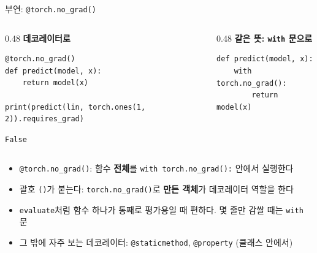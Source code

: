 \documentclass[aspectratio=169,11pt]{beamer}
\newcommand{\code}[1]{\texttt{#1}}
\begin{document}
\begin{frame}[fragile]{부연: \code{@torch.no\_grad()}}
\begin{columns}[T,onlytextwidth]
\begin{column}{0.48\textwidth}
\textbf{데코레이터로}
\begin{lstlisting}
@torch.no_grad()
def predict(model, x):
    return model(x)

print(predict(lin, torch.ones(1, 2)).requires_grad)
\end{lstlisting}
\begin{lstlisting}[style=outstyle]
False
\end{lstlisting}
\end{column}
\begin{column}{0.48\textwidth}
\textbf{같은 뜻: \code{with} 문으로}
\begin{lstlisting}
def predict(model, x):
    with torch.no_grad():
        return model(x)
\end{lstlisting}
\end{column}
\end{columns}
\vskip2mm
\begin{itemize}
\item \code{@torch.no\_grad()}: 함수 \textbf{전체}를 \code{with torch.no\_grad():} 안에서 실행한다
\item 괄호 \code{()}가 붙는다: \code{torch.no\_grad()}로 \textbf{만든 객체}가 데코레이터 역할을 한다
\item \code{evaluate}처럼 함수 하나가 통째로 평가용일 때 편하다. 몇 줄만 감쌀 때는 \code{with} 문
\item 그 밖에 자주 보는 데코레이터: \code{@staticmethod}, \code{@property} (클래스 안에서)
\end{itemize}
\end{frame}
\end{document}
